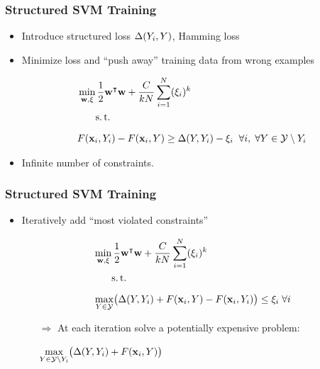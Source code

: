 \begin{frame}
    \frametitle{Structured SVM Training}
    \begin{itemize}
          \item Introduce structured loss $\Delta(Y_i, Y)$, \eg Hamming loss
          \item Minimize loss and ``push away'' training data from wrong examples
          \item[]
        \begin{align}
            &\min_{\VEC{w}, \xi} \frac{1}{2}\dualvec{w}\VEC{w} + \frac{C}{kN} \sum_{i=1}^N(\xi_i)^k
            \\ \nonumber
            &\phantom{\min_{\VEC{w}, \xi}} \st \\ \nonumber
            &F(\VEC{x}_i, Y_i) - F(\VEC{x}_i, Y) \ge \Delta(Y, Y_i) - \xi_i \; \; \forall i, \; \forall Y \in \mathcal{Y}\setminus Y_i 
        \end{align}
          \item Infinite number of constraints.
    \end{itemize}

\end{frame}

\begin{frame}
    \frametitle{Structured SVM Training}
    \begin{itemize}
          \item Iteratively add ``most violated constraints''
          \item[]
        \begin{align}
            &\min_{\VEC{w}, \xi} \frac{1}{2}\dualvec{w}\VEC{w} + \frac{C}{kN} \sum_{i=1}^N(\xi_i)^k
            \\ \nonumber
            &\phantom{\min_{\VEC{w}, \xi}} \st \\ \nonumber
            &\max_{Y\in\mathcal{Y}} \bigl(\Delta(Y, Y_i) + F( \VEC{x}_i, Y) - F(\VEC{x}_i, Y_i) \bigr) \le \xi_i
            \; \forall i 
        \end{align}
        \begin{itemize}
              \item[$\Rightarrow$] At each iteration solve a potentially expensive problem:
              \item[] $\displaystyle \max_{Y\in\mathcal{Y}\setminus Y_i} \bigl(\Delta(Y, Y_i) + F( \textbf{x}_i, Y) \bigr)$
        \end{itemize}
    \end{itemize}
    
\end{frame}

